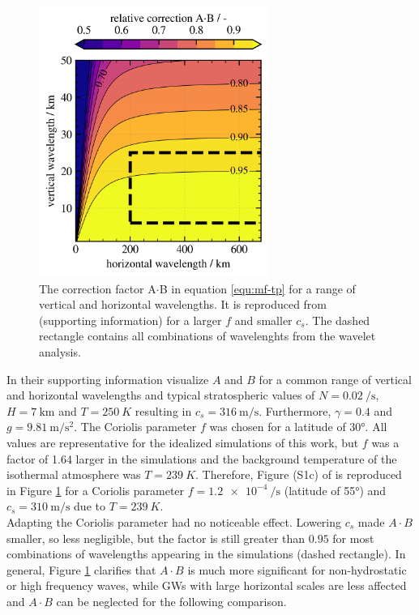 \begin{figure}
    \includegraphics[width=7.5cm]{figures_3D/waveletAna_mfcorrection_factor.png}
    \caption{The correction factor A$\cdot$B in equation \ref{equ:mf-tp} for a range of vertical and horizontal wavelengths. It is reproduced from \textcite[]{ern_directional_2017} (supporting information) for a larger $f$ and smaller $c_s$. The dashed rectangle contains all combinations of wavelenghts from the wavelet analysis.}
    \label{fig:mf_correction}
\end{figure}
In their supporting information \textcite[]{ern_directional_2017} visualize $A$ and $B$ for a common range of vertical and horizontal wavelengths and typical stratospheric values of $N=\SI{0.02}{\per\second}$, $H=\SI{7}{\kilo\meter}$ and $T=\SI{250}{K}$ resulting in $c_s = \SI{316}{\meter\per\second}$. Furthermore, $\gamma=0.4$ and $g=\SI{9.81}{\meter\per\second^2}$. The Coriolis parameter $f$ was chosen for a latitude of 30°. All values are representative for the idealized simulations of this work, but $f$ was a factor of 1.64 larger in the simulations and the background temperature of the isothermal atmosphere was $T=\SI{239}{K}$. Therefore, Figure (S1c) of \textcite[]{ern_directional_2017} is reproduced in Figure \ref{fig:mf_correction} for a Coriolis parameter $f=\SI{1.2e-4}{\per\second}$ (latitude of 55°) and $c_s = \SI{310}{\meter\per\second}$ due to $T=\SI{239}{K}$. \\
Adapting the Coriolis parameter had no noticeable effect. Lowering $c_s$ made $A \cdot B$ smaller, so less negligible, but the factor is still greater than $0.95$ for most combinations of wavelengths appearing in the simulations (dashed rectangle). In general, Figure \ref{fig:mf_correction} clarifies that $A \cdot B$ is much more significant for non-hydrostatic or high frequency waves, while GWs with large horizontal scales are less affected and $A \cdot B$ can be neglected for the following comparison.

